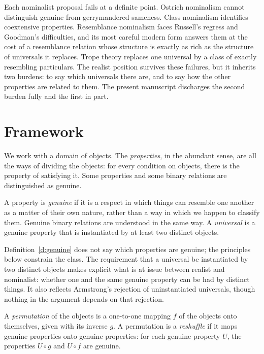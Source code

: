 \documentclass{situationist-preprint}
\begin{document}
Each nominalist proposal fails at a definite point. Ostrich nominalism cannot distinguish genuine from gerrymandered sameness. Class nominalism identifies coextensive properties. Resemblance nominalism faces Russell's regress and Goodman's difficulties, and its most careful modern form \citep{RodriguezPereyra2002} answers them at the cost of a resemblance relation whose structure is exactly as rich as the structure of universals it replaces. Trope theory replaces one universal by a class of exactly resembling particulars. The realist position survives these failures, but it inherits two burdens: to say which universals there are, and to say how the other properties are related to them. The present manuscript discharges the second burden fully and the first in part.

\section{Framework}\label{s:framework}

We work with a domain of objects. The \emph{properties}, in the abundant sense, are all the ways of dividing the objects: for every condition on objects, there is the property of satisfying it. Some properties and some binary relations are distinguished as genuine.

\begin{definition}\label{d:genuine}
A property is \emph{genuine} if it is a respect in which things can resemble one another as a matter of their own nature, rather than a way in which we happen to classify them. Genuine binary relations are understood in the same way. A \emph{universal} is a genuine property that is instantiated by at least two distinct objects.
\end{definition}

Definition~\ref{d:genuine} does not say which properties are genuine; the principles below constrain the class. The requirement that a universal be instantiated by two distinct objects makes explicit what is at issue between realist and nominalist: whether one and the same genuine property can be had by distinct things. It also reflects Armstrong's rejection of uninstantiated universals, though nothing in the argument depends on that rejection.

\begin{definition}\label{d:reshuffle}
A \emph{permutation} of the objects is a one-to-one mapping $f$ of the objects onto themselves, given with its inverse $g$. A permutation is a \emph{reshuffle} if it maps genuine properties onto genuine properties: for each genuine property $U$, the properties $U \circ g$ and $U \circ f$ are genuine.
\end{definition}
\end{document}
